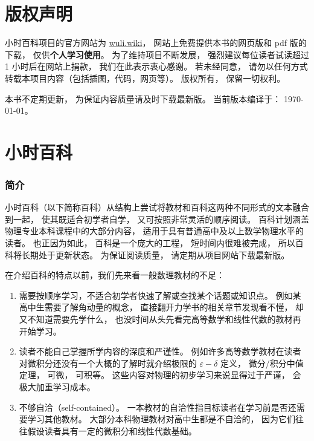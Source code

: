 
\chapter*{版权声明}

小时百科项目的官方网站为 \href{https://wuli.wiki}{wuli.wiki}， 网站上免费提供本书的网页版和 pdf 版的下载， 仅供\textbf{个人学习使用}。 为了维持项目不断发展， 强烈建议每位读者试读超过 1 小时后在网站上捐款， 我们在此表示衷心感谢。 若未经同意， 请勿以任何方式转载本项目内容（包括插图，代码，网页等）。 版权所有， 保留一切权利。

本书不定期更新， 为保证内容质量请及时下载最新版。 当前版本编译于： \today。

\chapter*{小时百科}

\subsection{简介}

小时百科（以下简称百科）从结构上尝试将教材和百科这两种不同形式的文本融合到一起， 使其既适合初学者自学， 又可按照非常灵活的顺序阅读。 百科计划涵盖物理专业本科课程中的大部分内容， 适用于具有普通高中及以上数学物理水平的读者。 也正因为如此， 百科是一个庞大的工程， 短时间内很难被完成， 所以百科将长期处于更新状态。 为保证阅读质量， 请定期从项目网站下载最新版。

在介绍百科的特点以前，我们先来看一般数理教材的不足：
\begin{enumerate}
\item 需要按顺序学习，不适合初学者快速了解或查找某个话题或知识点。 例如某高中生需要了解角动量的概念， 直接翻开力学书的相关章节发现看不懂， 却又不知道需要先学什么， 也没时间从头先看完高等数学和线性代数的教材再开始学习。
\item 读者不能自己掌握所学内容的深度和严谨性。 例如许多高等数学教材在读者对微积分还没有一个大概的了解时就介绍极限的 $\varepsilon-\delta$ 定义， 微分/积分中值定理， 可微， 可积等。 这些内容对物理的初步学习来说显得过于严谨， 会极大加重学习成本。
\item 不够自洽（self-contained）。 一本教材的自洽性指目标读者在学习前是否还需要学习其他教材。 大部分本科物理教材对高中生都是不自洽的， 因为它们往往假设读者具有一定的微积分和线性代数基础。
\end{enumerate}

